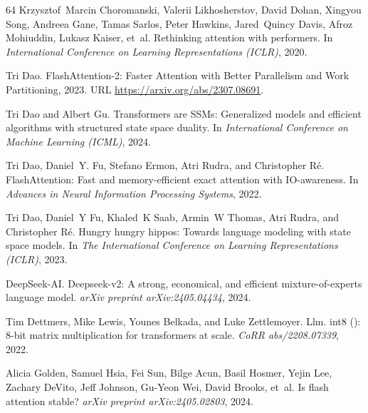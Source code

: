 \documentclass{article}
\begin{document}
\begin{thebibliography}{64}
Krzysztof~Marcin Choromanski, Valerii Likhosherstov, David Dohan, Xingyou Song,
  Andreea Gane, Tamas Sarlos, Peter Hawkins, Jared~Quincy Davis, Afroz
  Mohiuddin, Lukasz Kaiser, et~al.
\newblock Rethinking attention with performers.
\newblock In \emph{International Conference on Learning Representations
  (ICLR)}, 2020.

Tri Dao.
\newblock Flash{A}ttention-2: Faster {A}ttention with {B}etter {P}arallelism
  and {W}ork {P}artitioning, 2023.
\newblock URL \url{https://arxiv.org/abs/2307.08691}.

Tri Dao and Albert Gu.
\newblock Transformers are {SSM}s: Generalized models and efficient algorithms
  with structured state space duality.
\newblock In \emph{International Conference on Machine Learning (ICML)}, 2024.

Tri Dao, Daniel~Y. Fu, Stefano Ermon, Atri Rudra, and Christopher R{\'e}.
\newblock Flash{A}ttention: Fast and memory-efficient exact attention with
  {IO}-awareness.
\newblock In \emph{Advances in Neural Information Processing Systems}, 2022.

Tri Dao, Daniel~Y Fu, Khaled~K Saab, Armin~W Thomas, Atri Rudra, and
  Christopher R{\'e}.
\newblock Hungry hungry hippos: Towards language modeling with state space
  models.
\newblock In \emph{The International Conference on Learning Representations
  ({ICLR})}, 2023.

DeepSeek-AI.
\newblock Deepseek-v2: A strong, economical, and efficient mixture-of-experts
  language model.
\newblock \emph{arXiv preprint arXiv:2405.04434}, 2024.

Tim Dettmers, Mike Lewis, Younes Belkada, and Luke Zettlemoyer.
\newblock Llm. int8 (): 8-bit matrix multiplication for transformers at scale.
\newblock \emph{CoRR abs/2208.07339}, 2022.

Alicia Golden, Samuel Hsia, Fei Sun, Bilge Acun, Basil Hosmer, Yejin Lee,
  Zachary DeVito, Jeff Johnson, Gu-Yeon Wei, David Brooks, et~al.
\newblock Is flash attention stable?
\newblock \emph{arXiv preprint arXiv:2405.02803}, 2024.


\end{thebibliography}
\end{document}
